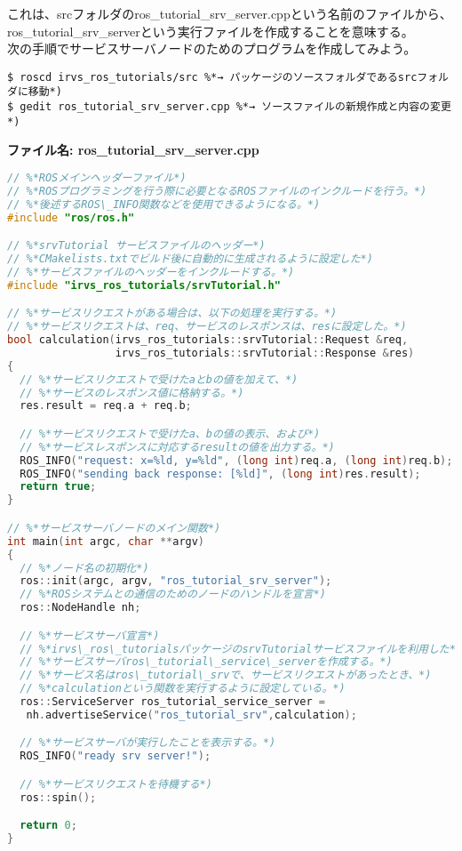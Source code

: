 これは、srcフォルダのros\_tutorial\_srv\_server.cppという名前のファイルから、 ros\_tutorial\_srv\_serverという実行ファイルを作成することを意味する。\\

次の手順でサービスサーバノードのためのプログラムを作成してみよう。

\begin{lstlisting}[language=ROS]
$ roscd irvs_ros_tutorials/src %*→ パッケージのソースフォルダであるsrcフォルダに移動*)
$ gedit ros_tutorial_srv_server.cpp %*→ ソースファイルの新規作成と内容の変更*)
\end{lstlisting}

\noindent\textbf{ファイル名: ros\_tutorial\_srv\_server.cpp}
\begin{lstlisting}[language=C++]
// %*ROSメインヘッダーファイル*)
// %*ROSプログラミングを行う際に必要となるROSファイルのインクルードを行う。*)
// %*後述するROS\_INFO関数などを使用できるようになる。*)
#include "ros/ros.h"

// %*srvTutorial サービスファイルのヘッダー*)
// %*CMakelists.txtでビルド後に自動的に生成されるように設定した*)
// %*サービスファイルのヘッダーをインクルードする。*)
#include "irvs_ros_tutorials/srvTutorial.h"

// %*サービスリクエストがある場合は、以下の処理を実行する。*)
// %*サービスリクエストは、req、サービスのレスポンスは、resに設定した。*)
bool calculation(irvs_ros_tutorials::srvTutorial::Request &req,
                 irvs_ros_tutorials::srvTutorial::Response &res)
{
  // %*サービスリクエストで受けたaとbの値を加えて、*)
  // %*サービスのレスポンス値に格納する。*)
  res.result = req.a + req.b;

  // %*サービスリクエストで受けたa、bの値の表示、および*)
  // %*サービスレスポンスに対応するresultの値を出力する。*)
  ROS_INFO("request: x=%ld, y=%ld", (long int)req.a, (long int)req.b);
  ROS_INFO("sending back response: [%ld]", (long int)res.result);
  return true;
}

// %*サービスサーバノードのメイン関数*)
int main(int argc, char **argv)
{
  // %*ノード名の初期化*)
  ros::init(argc, argv, "ros_tutorial_srv_server");
  // %*ROSシステムとの通信のためのノードのハンドルを宣言*)
  ros::NodeHandle nh;

  // %*サービスサーバ宣言*)
  // %*irvs\_ros\_tutorialsパッケージのsrvTutorialサービスファイルを利用した*)
  // %*サービスサーバros\_tutorial\_service\_serverを作成する。*)
  // %*サービス名はros\_tutorial\_srvで、サービスリクエストがあったとき、*)
  // %*calculationという関数を実行するように設定している。*)
  ros::ServiceServer ros_tutorial_service_server =
   nh.advertiseService("ros_tutorial_srv",calculation);

  // %*サービスサーバが実行したことを表示する。*)
  ROS_INFO("ready srv server!");

  // %*サービスリクエストを待機する*)
  ros::spin();

  return 0;
}
\end{lstlisting}

